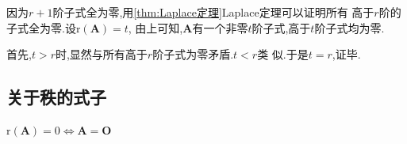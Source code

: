 \begin{formal}
\begin{Proof}
因为$r+1$阶子式全为零,用\cref{thm:Laplace定理}Laplace定理可以证明所有
高于$r$阶的子式全为零.设$\mathrm{r}\left(\bm{A}\right)=t$,
由上可知,$\bm{A}$有一个非零$t$阶子式,高于$t$阶子式均为零.

首先,$t>r$时,显然与所有高于$r$阶子式为零矛盾.$t<r$类
似.于是$t=r$,证毕.
\end{Proof}
\end{formal}
\subsection{关于秩的式子}
\begin{formal}
    \begin{definition}[零秩]\label{def:零秩}
        $\mathrm{r}\left(\bm{A}\right)= 0
\Longleftrightarrow 
\bm{A} = \bm{O}
$
    \end{definition}
\end{formal}

